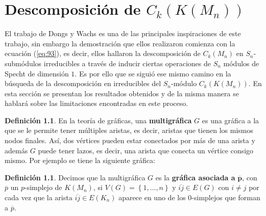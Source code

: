 \documentclass[12pt]{book}
\theoremstyle{definition}
\newtheorem{definition}[theorem]{Definición}
\newcounter{in}
\newcounter{ini}
\begin{document}
\chapter{Descomposición de $C_{k}(K(M_n))$}
\label{Des_esp_cad}
El trabajo de Dongs y Wachs \cite{dong2002combinatorial} es una de las
principales inspiraciones de este trabajo, sin embargo la demostración
que ellos realizaron comienza con la ecuación (\ref{eq:93}), es decir, ellos
hallaron la descomposición de $C_{k}(M_{n})$ en $S_{n}$-submódulos
irreducibles a través de inducir ciertas operaciones de $S_{n}$
módulos de Specht de dimensión $1$. Es por ello que se siguió ese
mismo camino en la búsqueda de la descomposición en irreducibles del $S_{n}$-módulo $C_{k}(K(M_{n}))$. En esta sección se presentan los resultados obtenidos y
de la misma manera se hablará sobre las limitaciones encontradas en
este proceso.
\begin{definition}
En la teoría de gráficas, una \textbf{multigráfica} $G$ es una gráfica
a la que se le permite tener múltiples aristas, es decir, aristas que
tienen los mismos nodos finales. Así, dos vértices pueden estar
conectados por más de una arista y además $G$ puede tener lazos, es
decir, una arista que conecta un vértice consigo mismo. Por ejemplo se
tiene la siguiente gráfica:
\begin{center}
\end{center}
\end{definition}
\begin{definition}
Decimos que la multigráfica $G$ es la \textbf{gráfica asociada a} $\boldsymbol{\overline{p}}$, con $\overline{p}$ un $p$-simplejo de $K(M_{n})$, si $V(G) = \left \{
1,\ldots,n \right \}$ y $\overline{ij} \in E(G)$ con $i \neq j$ por
cada vez que la arista $\overline{ij} \in E(K_{n})$ aparece en uno de los $0$-simplejos que forman a $\overline{p}$.
\end{definition}
\end{document}
